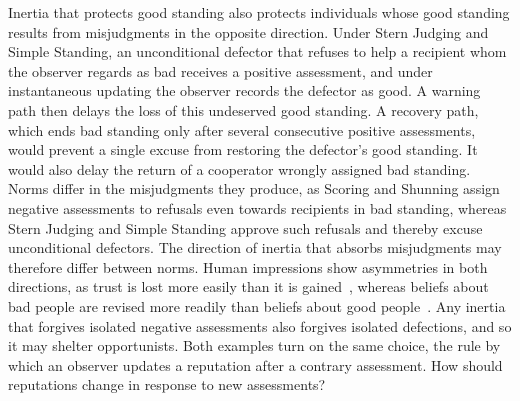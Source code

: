 \documentclass[10pt]{wlscirep}
\theoremstyle{plain}
\theoremstyle{remark}
\begin{document}
Inertia that protects good standing also protects individuals whose good standing results from misjudgments in the opposite direction. Under Stern Judging and Simple Standing, an unconditional defector that refuses to help a recipient whom the observer regards as bad receives a positive assessment, and under instantaneous updating the observer records the defector as good. A warning path then delays the loss of this undeserved good standing. A recovery path, which ends bad standing only after several consecutive positive assessments, would prevent a single excuse from restoring the defector's good standing. It would also delay the return of a cooperator wrongly assigned bad standing. Norms differ in the misjudgments they produce, as Scoring and Shunning assign negative assessments to refusals even towards recipients in bad standing, whereas Stern Judging and Simple Standing approve such refusals and thereby excuse unconditional defectors. The direction of inertia that absorbs misjudgments may therefore differ between norms. Human impressions show asymmetries in both directions, as trust is lost more easily than it is gained~\cite{slovic1993}, whereas beliefs about bad people are revised more readily than beliefs about good people~\cite{siegel2018}. Any inertia that forgives isolated negative assessments also forgives isolated defections, and so it may shelter opportunists. Both examples turn on the same choice, the rule by which an observer updates a reputation after a contrary assessment. How should reputations change in response to new assessments?
\end{document}

